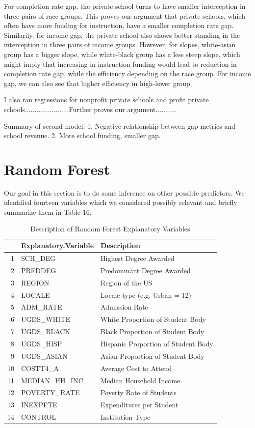 \documentclass{article}
\begin{document}
For completion rate gap, the private school turns to have smaller interception in three pairs of race groups. This proves our argument that private schools, which often have more funding for instruction, have a smaller completion rate gap. Similarily, for income gap, the private school also shows better standing in the interception in three pairs of income groups. However, for slopes, white-asian group has a bigger slope, while white-black group has a less steep slope, which might imply that increasing in instruction funding would lead to reduction in completion rate gap, while the efficiency depending on the race group. For income gap, we can also see that higher efficiency in high-lower group. 

I also ran regressions for nonprofit private schools and profit private schools.......................Further proves our argument...........

Summary of second model:
1. Negative relationship between gap metrics and school revenue.
2. More school funding, smaller gap. 


\newpage


\newpage
\section{Random Forest}

Our goal in this section is to do some inference on other possible predictors. We identified fourteen variables which we considered possibly relevant and briefly summarize them in Table 16.
  

 
\begin{table}[ht]
\centering
\caption{Description of Random Forest Explanatory Variables} 
\begin{tabular}{rll}
  \hline
 & Explanatory.Variable & Description \\ 
  \hline
1 & SCH\_DEG & Highest Degree Awarded \\ 
  2 & PREDDEG & Predominant Degree Awarded \\ 
  3 & REGION & Region of the US \\ 
  4 & LOCALE & Locale type (e.g. Urban = 12) \\ 
  5 & ADM\_RATE & Admission Rate \\ 
  6 & UGDS\_WHITE & White Proportion of Student Body \\ 
  7 & UGDS\_BLACK & Black Proportion of Student Body \\ 
  8 & UGDS\_HISP & Hispanic Proportion of Student Body \\ 
  9 & UGDS\_ASIAN & Asian Proportion of Student Body \\ 
  10 & COSTT4\_A & Average Cost to Attend \\ 
  11 & MEDIAN\_HH\_INC & Median Household Income \\ 
  12 & POVERTY\_RATE & Poverty Rate of Students \\ 
  13 & INEXPFTE & Expenditures per Student \\ 
  14 & CONTROL & Institution Type \\ 
   \hline
\end{tabular}
\end{table}
\end{document}
